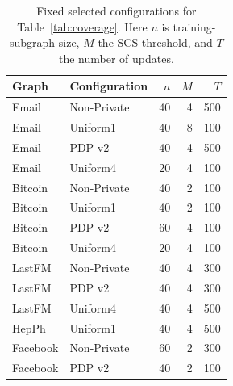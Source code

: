 \begin{table}[htbp]
\centering\small
\caption{Fixed selected configurations for Table~\ref{tab:coverage}. Here $n$ is training-subgraph size, $M$ the SCS threshold, and $T$ the number of updates.}\label{tab:frozenparams}
\begin{tabular}{llrrr}
\toprule
Graph & Configuration & $n$ & $M$ & $T$\\ \midrule
Email & Non-Private & 40 & 4 & 500 \\
Email & Uniform1 & 40 & 8 & 100 \\
Email & PDP v2 & 40 & 4 & 500 \\
Email & Uniform4 & 20 & 4 & 100 \\
Bitcoin & Non-Private & 40 & 2 & 100 \\
Bitcoin & Uniform1 & 40 & 2 & 100 \\
Bitcoin & PDP v2 & 60 & 4 & 100 \\
Bitcoin & Uniform4 & 20 & 4 & 100 \\
LastFM & Non-Private & 40 & 4 & 300 \\
LastFM & PDP v2 & 40 & 4 & 300 \\
LastFM & Uniform4 & 40 & 4 & 500 \\
HepPh & Uniform1 & 40 & 4 & 500 \\
Facebook & Non-Private & 60 & 2 & 300 \\
Facebook & PDP v2 & 40 & 2 & 100 \\
\bottomrule\end{tabular}
\end{table}
